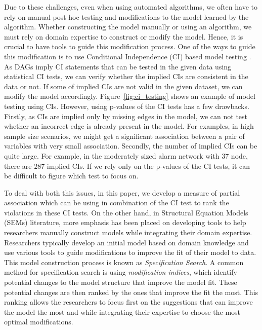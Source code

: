 \documentclass[letterpaper]{article} %
\begin{document}

Due to these challenges, even when using automated algorithms, we often have to
rely on manual post hoc testing and modifications to the model learned by the
algorithm. Whether constructing the model manually or using an algorithm, we
must rely on domain expertise to construct or modify the model. Hence, it is
crucial to have tools to guide this modification process. One of the ways to
guide this modification is to use Conditional Independence (CI) based model
testing \cite{Ankan2023}. As DAGs imply CI statements that can be tested in the
given data using statistical CI tests, we can verify whether the implied CIs
are consistent in the data or not. If some of implied CIs are not valid in the
given dataset, we can modify the model accordingly. Figure~\ref{fig:ci_testing}
shows an example of model testing using CIs. However, using p-values of the CI
tests has a few drawbacks. Firstly, as CIs are implied only by missing edges in
the model, we can not test whether an incorrect edge is already present in the
model. For examples, in high sample size scenarios, we might get a significant
association between a pair of variables with very small association. Secondly,
the number of implied CIs can be quite large. For example, in the moderately
sized alarm network with $ 37 $ node, there are $287$ implied CIs. If we rely
only on the p-values of the CI tests, it can be difficult to figure which test
to focus on.

To deal with both this issues, in this paper, we develop a measure of partial
association which can be using in combination of the CI test to rank the
violations in these CI tests. On the other hand, in Structural Equation Models
(SEMs) literature, more emphasis has been placed on developing tools to help
researchers manually construct models while integrating their domain expertise.
Researchers typically develop an initial model based on domain knowledge and
use various tools to guide modifications to improve the fit of their model to
data. This model construction process is known as \emph{Specification Search}.
A common method for specification search is using \emph{modification indices},
which identify potential changes to the model structure that improve the model
fit. These potential changes are then ranked by the ones that improve the fit
the most. This ranking allows the researchers to focus first on the suggestions
that can improve the model the most and while integrating their expertise to
choose the most optimal modifications.
\end{document}
